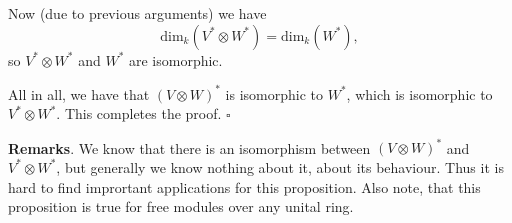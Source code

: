 \documentclass[12pt]{article}
\begin{document}
Now (due to previous arguments) we have $$\mathrm{dim}_{k}(V^{*}\otimes W^{*})=\mathrm{dim}_{k}(W^{*}),$$
so $V^{*}\otimes W^{*}$ and $W^{*}$ are isomorphic.

All in all, we have that $(V\otimes W)^{*}$ is isomorphic to $W^{*}$, which is isomorphic to $V^{*}\otimes W^{*}$. This completes the proof. $\square$



\textbf{Remarks}. We know that there is an isomorphism between $(V\otimes W)^{*}$ and $V^{*}\otimes W^{*}$, but generally we know nothing about it, about its behaviour. Thus it is hard to find imprortant applications for this proposition. Also note, that this proposition is true for free modules over any unital ring.
\end{document}
